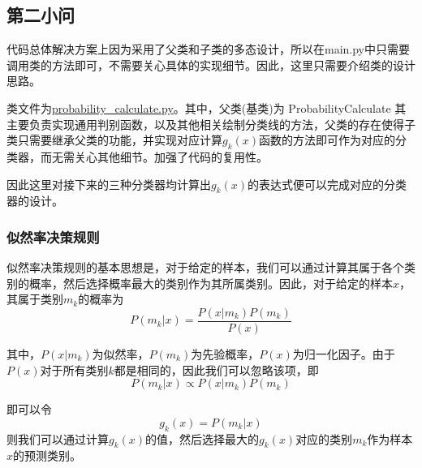 \documentclass[UTF8]{article} %
\begin{document}
    \subsection{第二小问}
    代码总体解决方案上因为采用了父类和子类的多态设计，所以在main.py中只需要调用类的方法即可，不需要关心具体的实现细节。因此，这里只需要介绍类的设计思路。

    类文件为\href{run:probability_calculate.py}{probability\_calculate.py}。其中，父类(基类)为 ProbabilityCalculate 其主要负责实现通用判别函数，以及其他相关绘制分类线的方法，父类的存在使得子类只需要继承父类的功能，并实现对应计算$g_k(x)$函数的方法即可作为对应的分类器，而无需关心其他细节。加强了代码的复用性。

    因此这里对接下来的三种分类器均计算出$g_k(x)$的表达式便可以完成对应的分类器的设计。

    \subsubsection{似然率决策规则}\label{subsubsec:likelihood}
    似然率决策规则的基本思想是，对于给定的样本，我们可以通过计算其属于各个类别的概率，然后选择概率最大的类别作为其所属类别。因此，对于给定的样本$x$，其属于类别$m_k$的概率为
    \begin{equation}
        P(m_k|x) = \frac{P(x|m_k)P(m_k)}{P(x)} \label{eq:a}
    \end{equation}

    其中，$P(x|m_k)$为似然率，$P(m_k)$为先验概率，$P(x)$为归一化因子。由于$P(x)$对于所有类别$k$都是相同的，因此我们可以忽略该项，即
    \begin{equation}
        P(m_k|x) \propto P(x|m_k)P(m_k) \label{eq:b}
    \end{equation}

    即可以令
    \begin{equation}
        g_k(x) = P(m_k|x) \label{eq:c}
    \end{equation}
    则我们可以通过计算$g_k(x)$的值，然后选择最大的$g_k(x)$对应的类别$m_k$作为样本$x$的预测类别。
\end{document}
